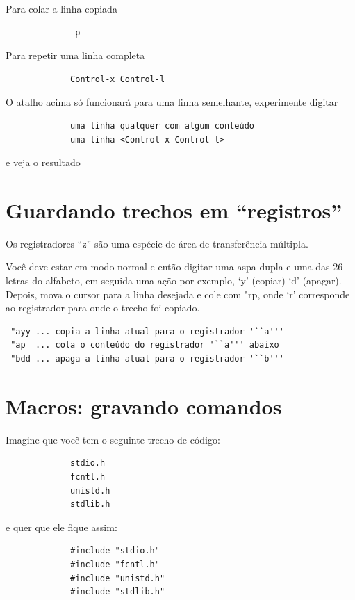\documentclass[10pt,a4paper,openany]{book}
\begin{document}
Para colar a linha copiada

\begin{verbatim}
			  p
\end{verbatim}

Para repetir uma linha completa

\begin{verbatim}
			 Control-x Control-l
\end{verbatim}

O atalho acima só funcionará para uma linha semelhante, experimente
digitar

\begin{verbatim}
			 uma linha qualquer com algum conteúdo
			 uma linha <Control-x Control-l>
\end{verbatim}

e veja o resultado

\section{Guardando trechos em ``registros''}
\label{sec:Guardando trechos em ``registros''}

Os registradores ``z'' são uma espécie de área de transferência múltipla.

Você deve estar em modo normal e então digitar uma aspa dupla e uma
das 26 letras do alfabeto, em seguida uma ação por exemplo, `y'
(copiar) `d' (apagar). Depois, mova o cursor para a linha
desejada e cole com "rp, onde `r' corresponde ao
registrador para onde o trecho foi copiado.

\begin{verbatim}
 "ayy ... copia a linha atual para o registrador '``a'''
 "ap  ... cola o conteúdo do registrador '``a''' abaixo
 "bdd ... apaga a linha atual para o registrador '``b'''
\end{verbatim}

\section{Macros: gravando comandos}\label{Macros: gravando comandos}

Imagine que você tem o seguinte trecho de código:

\begin{verbatim}
			 stdio.h
			 fcntl.h
			 unistd.h
			 stdlib.h
\end{verbatim}

e quer que ele fique assim:

\begin{verbatim}
			 #include "stdio.h"
			 #include "fcntl.h"
			 #include "unistd.h"
			 #include "stdlib.h"
\end{verbatim}
\end{document}
